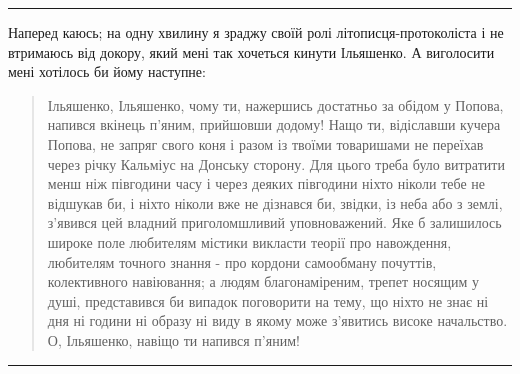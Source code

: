 \documentclass[a4paper,20pt]{report}
\begin{document}
\par\noindent\rule{\textwidth}{0.4pt}

Наперед каюсь; на одну хвилину я зраджу своїй ролі літописця-протоколіста і не втримаюсь від 
докору, який мені так хочеться кинути Ільяшенко. А виголосити мені хотілось би йому наступне:

\begin{quote}
\em\bfseries

Ільяшенко, Ільяшенко, чому ти, нажершись достатньо за обідом у Попова, напився
вкінець п'яним, прийшовши додому! Нащо ти, відіславши кучера Попова, не
запряг свого коня і разом із твоїми товаришами не переїхав через річку
Кальміус на Донську сторону.  Для цього треба було витратити менш ніж
півгодини часу і через деяких півгодини ніхто ніколи тебе не відшукав
би, і ніхто ніколи вже не дізнався би, звідки, із неба або з землі,
з'явився цей владний приголомшливий уповноважений. Яке б залишилось
широке поле любителям містики викласти теорії про навождення, любителям
точного знання - про кордони самообману почуттів, колективного
навіювання; а людям благонаміреним, трепет носящим у душі, представився
би випадок поговорити на тему, що ніхто не знає ні дня ні години ні
образу ні виду в якому може з'явитись високе начальство. О, Ільяшенко,
навіщо ти напився п'яним!
    

\end{quote}

\par\noindent\rule{\textwidth}{0.4pt}
\end{document}
